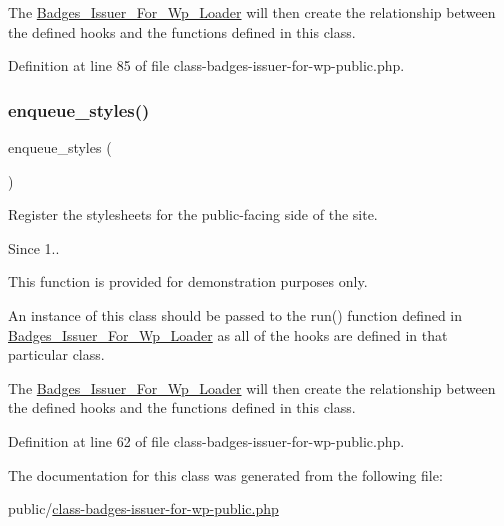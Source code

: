 The \hyperlink{class_badges___issuer___for___wp___loader}{Badges\+\_\+\+Issuer\+\_\+\+For\+\_\+\+Wp\+\_\+\+Loader} will then create the relationship between the defined hooks and the functions defined in this class.

Definition at line 85 of file class-\/badges-\/issuer-\/for-\/wp-\/public.\+php.

\mbox{\label{class_badges___issuer___for___wp___public_a6ec94168591737dfca849a6934db3cdf}} 
\subsubsection{\texorpdfstring{enqueue\+\_\+styles()}{enqueue\_styles()}}
{\footnotesize\ttfamily enqueue\+\_\+styles (\begin{DoxyParamCaption}{ }\end{DoxyParamCaption})}

Register the stylesheets for the public-\/facing side of the site.

\begin{DoxySince}{Since}
1.. 
\end{DoxySince}
This function is provided for demonstration purposes only.

An instance of this class should be passed to the run() function defined in \hyperlink{class_badges___issuer___for___wp___loader}{Badges\+\_\+\+Issuer\+\_\+\+For\+\_\+\+Wp\+\_\+\+Loader} as all of the hooks are defined in that particular class.

The \hyperlink{class_badges___issuer___for___wp___loader}{Badges\+\_\+\+Issuer\+\_\+\+For\+\_\+\+Wp\+\_\+\+Loader} will then create the relationship between the defined hooks and the functions defined in this class.

Definition at line 62 of file class-\/badges-\/issuer-\/for-\/wp-\/public.\+php.



The documentation for this class was generated from the following file\+:\begin{DoxyCompactItemize}
\item 
public/\hyperlink{class-badges-issuer-for-wp-public_8php}{class-\/badges-\/issuer-\/for-\/wp-\/public.\+php}\end{DoxyCompactItemize}
